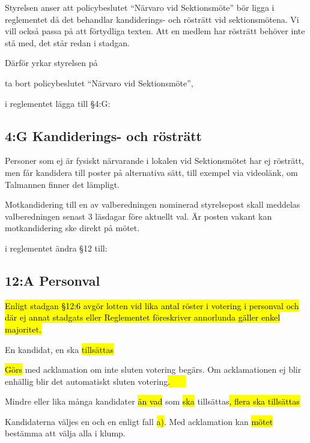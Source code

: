 \documentclass[../_main/handlingar.tex]{subfiles}
\begin{document}

Styrelsen anser att policybeslutet ``Närvaro vid Sektionsmöte'' bör ligga i reglementet då det behandlar kandiderings- och rösträtt vid sektionsmötena. Vi vill också passa på att förtydliga texten. Att en medlem har rösträtt behöver inte stå med, det står redan i stadgan.

Därför yrkar styrelsen på

\begin{attsatser}
    \att ta bort policybeslutet ``Närvaro vid Sektionsmöte'',

    \att i reglementet lägga till \S4:G:\par
        \subsection*{4:G Kandiderings- och rösträtt}
        Personer som ej är fysiskt närvarande i lokalen vid Sektionsmötet har ej rösträtt, men får kandidera till poster på alternativa sätt, till exempel via videolänk, om Talmannen finner det lämpligt.

        Motkandidering till en av valberedningen nominerad styrelsepost skall meddelas valberedningen senast 3 läsdagar före aktuellt val. Är posten vakant kan motkandidering ske direkt på mötet.

    \newpage

    \att i reglementet ändra \S12 till:\par
        \subsection{12:A Personval}

        \hl{Enligt stadgan \S12:6 avgör lotten vid lika antal röster i votering i personval och där ej annat stadgats eller Reglementet föreskriver annorlunda gäller enkel majoritet.}

        \begin{alphlist}
        \item En kandidat, en ska \hl{tillsättas}\par
        \hl{Görs} med acklamation om inte sluten votering begärs. Om acklamationen ej blir enhällig blir det automatiskt sluten votering\hl{. \ \ \ }

        \item Mindre eller lika många kandidater \hl{än vad} som \hl{ska} tillsättas\hl{, flera ska tillsättas}\par
        Kandidaterna väljes en och en enligt fall \hl{a)}. Med acklamation kan \hl{mötet} bestämma att välja alla i klump.


\end{alphlist}
\end{attsatser}
\end{document}
